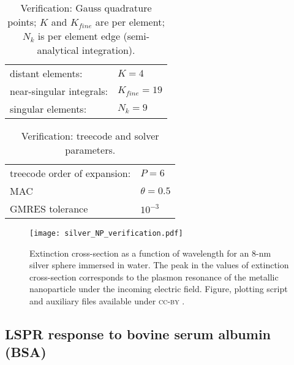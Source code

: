 \begin{table}[h]
    \centering
    \caption{\label{table:quadparams2} Verification: Gauss quadrature points; 
    $K$ and $K_{fine}$ are per element; $N_k $ is per element edge (semi-analytical integration). } 
    \begin{tabular}{l l}
    \hline%
     distant elements: & $K=4$ \\
     near-singular integrals:   & $ K_{fine}=19$ \\
     singular elements:  & $N_k =9$ \\
    \hline%
    \end{tabular}
\end{table}


\begin{table}[h]
    \centering
    \caption{\label{table:treeparams2} Verification: treecode and solver parameters.} 
    \begin{tabular}{l l}
    \hline%
    treecode order of expansion: & $P=6$\\
    MAC                                         & $\theta=0.5$\\
    GMRES tolerance                    & $10^{-3}$\\
    \hline%
    \end{tabular}
\end{table}


\begin{figure}[h] %
   \centering
   \texttt{[image: silver\_NP\_verification.pdf]} 
   \caption{Extinction cross-section as a function of wavelength for an $8$-nm
            silver sphere immersed in water. The peak in the values of extinction cross-section corresponds to the plasmon resonance of the metallic nanoparticle under the incoming electric field. Figure, plotting script and auxiliary files available under \textsc{cc-by} \cite{ClementiETal2018d}.}
   \label{fig:verif_sphere}
\end{figure}


\subsection{LSPR response to bovine serum albumin (BSA)} \label{sec:lspr_response}

